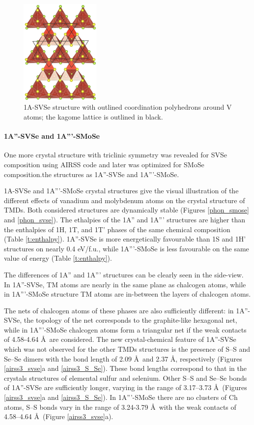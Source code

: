 \documentclass[a4paperm]{article}
\begin{document}
\begin{figure}[H]
        \includegraphics[width=0.35\textwidth]{airss1_v_poly.png}
        \caption{1A-SVSe structure with outlined coordination polyhedrons around V atoms; the kagome lattice is outlined in black.}
\label{airss1_poly}
\end{figure}




\paragraph{1A''-SVSe and 1A'''-SMoSe}
One more crystal structure with triclinic symmetry was revealed for SVSe composition using AIRSS code and later was optimized for SMoSe composition.the structures as 1A''-SVSe and 1A'''-SMoSe.


1A-SVSe and 1A'''-SMoSe crystal structures give the visual illustration of the different effects of vanadium and molybdenum atoms on the crystal structure of TMDs.
Both considered structures are dynamically stable (Figures \ref{phon_smose} and \ref{phon_svse}).
The ethalpies of the 1A'' and 1A''' structures are higher than the enthalpies of 1H, 1T, and 1T' phases of the same chemical composition (Table \ref{t:enthalpy}).
1A''-SVSe is more energetically favourable than 1S and 1H' structures on nearly 0.4 eV/f.u., while 1A'''-SMoSe is less favourable on the same value of energy (Table \ref{t:enthalpy}).


The differences of 1A'' and 1A''' structures can be clearly seen in the side-view.
In 1A''-SVSe, TM atoms are nearly in the same plane as chalcogen atoms, while in 1A'''-SMoSe structure TM atoms are in-between the layers of chalcogen atoms.

The nets of chalcogen atoms of these phases are also sufficiently different: in 1A''-SVSe, the topology of the net corresponds to the graphite-like hexagonal net, while in 1A'''-SMoSe chalcogen atoms form a triangular net if the weak contacts of 4.58-4.64 \AA\ are considered.
The new crystal-chemical feature of 1A''-SVSe which was not observed for the other TMDs structures is the presence of S--S and Se--Se dimers with the bond length of 2.09 \AA\ and 2.37 \AA, respectively (Figures \ref{airss3_svse}a and \ref{airss3_S_Se}).
These bond lengths correspond to that in the crystals structures of elemental sulfur and selenium.
Other S--S and Se--Se bonds of 1A''-SVSe are  sufficiently longer, varying in the range of 3.17--3.73 \AA\ (Figures \ref{airss3_svse}a and \ref{airss3_S_Se}).
In 1A'''-SMoSe there are no clusters of Ch atoms, S--S bonds vary in the range of 3.24-3.79 \AA\ with the weak contacts of 4.58--4.64 \AA\ (Figure \ref{airss3_svse}a).
\end{document}
